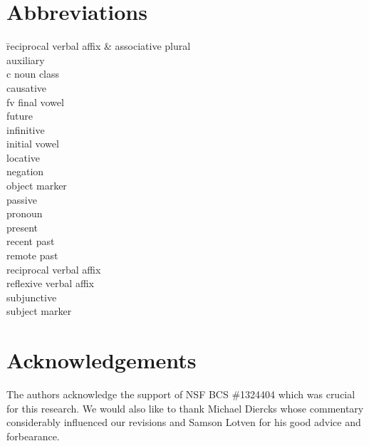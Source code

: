 \documentclass[output=paper,
modfonts
]{langscibook}
\begin{document}
\section*{Abbreviations}
\begin{multicols}{2}\label{pg:lesotho:abbreviations}
\begin{tabbing}
 \hspace{.5cm} \= reciprocal verbal affix\kill
\& \>  associative plural\\
 \> auxiliary\\
c \> noun class\\
 \> causative\\
fv \> final vowel\\
 \> future\\
 \> infinitive\\
 \> initial vowel\\
 \> locative\\
 \> negation\\
 \> object marker\\
 \> passive\\
 \> pronoun\\
 \> present\\
 \> recent past\\
 \> remote past\\
 \> reciprocal verbal affix\\
 \> reflexive verbal affix\\
 \> subjunctive\\
 \> subject marker
\end{tabbing}
\end{multicols}
\section*{Acknowledgements}
The authors acknowledge the support of NSF BCS \#1324404 which was crucial for this research. We would also like to thank Michael Diercks whose commentary considerably influenced our revisions and Samson Lotven for his good advice and forbearance. 


{\sloppy\printbibliography[heading=subbibliography,notkeyword=this]}
\end{document}
